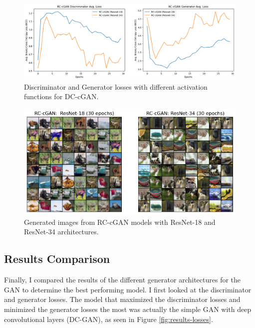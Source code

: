 \documentclass[twoside,11pt]{article}
\begin{document}
\begin{figure}[h!]
  \centering
  \includegraphics[width=16cm]{images/rccgan-experiments/rccgan-archs.png}
  \caption{Discriminator and Generator losses with different activation functions for DC-cGAN.}
  \label{fig:rccgan-archs}
\end{figure}

\begin{figure}[h!]
  \centering
  \includegraphics[width=15cm]{images/rccgan-experiments/rccgan-outputs.png}
  \caption{Generated images from RC-cGAN models with ResNet-18 and ResNet-34 architectures.}
  \label{fig:rccgan-outputs}
\end{figure}

\newpage

\subsection{Results Comparison}

Finally, I compared the results of the different generator architectures for the GAN to determine the best performing model. I first looked at the discriminator and generator losses. The model that maximized the discriminator losses and minimized the generator losses the most was actually the simple GAN with deep convolutional layers (DC-GAN), as seen in Figure \ref{fig:results-losses}.
\end{document}
